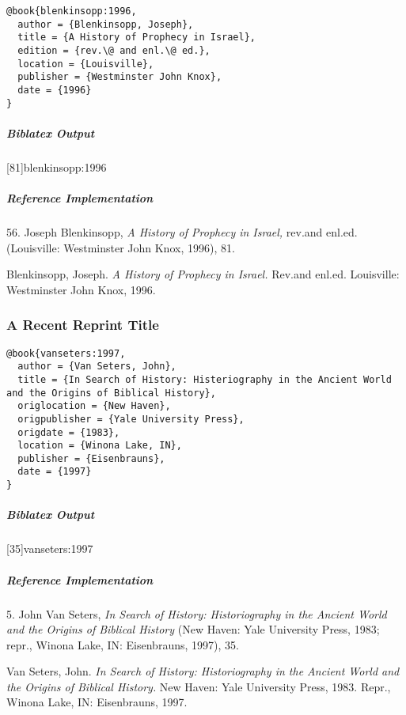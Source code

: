 \documentclass[a4paper]{article}
\newenvironment{biboutput}{%
  \subparagraph{Biblatex Output}
}{\color{black}}
\newenvironment{refimp}{%
  \subparagraph{Reference Implementation}
  \color{reference-colour}
  \rm
}{\par\color{black}}
\begin{document}
\begin{lstlisting}
@book{blenkinsopp:1996,
  author = {Blenkinsopp, Joseph},
  title = {A History of Prophecy in Israel},
  edition = {rev.\@ and enl.\@ ed.},
  location = {Louisville},
  publisher = {Westminster John Knox},
  date = {1996}
}
\end{lstlisting}  

\begin{biboutput}
  [81]{blenkinsopp:1996}
\end{biboutput}

\begin{refimp}
  \hspace*{\bibindent}56. Joseph Blenkinsopp, \emph{A History of Prophecy in
  Israel,} rev.\@ and enl.\@ ed. (Louisville: Westminster John Knox, 1996), 81.

  \hangindent\bibindent Blenkinsopp, Joseph. \emph{A History of Prophecy in
  Israel.} Rev.\@ and enl.\@ ed. Louisville: Westminster John Knox, 1996.
\end{refimp}

\subsubsection{A Recent Reprint Title}

\begin{lstlisting}
@book{vanseters:1997,
  author = {Van Seters, John},
  title = {In Search of History: Histeriography in the Ancient World and the Origins of Biblical History},
  origlocation = {New Haven},
  origpublisher = {Yale University Press},
  origdate = {1983},
  location = {Winona Lake, IN},
  publisher = {Eisenbrauns},
  date = {1997}
}
\end{lstlisting}  

\begin{biboutput}
  [35]{vanseters:1997}
\end{biboutput}

\begin{refimp}
  \hspace*{\bibindent}5. John Van Seters, \emph{In Search of History:
  Historiography in the Ancient World and the Origins of Biblical History}
  (New Haven: Yale University Press, 1983; repr., Winona Lake, IN:
  Eisenbrauns, 1997), 35.

  \hangindent\bibindent Van Seters, John. \emph{In Search of History:
  Historiography in the Ancient World and the Origins of Biblical History.}
  New Haven: Yale University Press, 1983. Repr., Winona Lake, IN: Eisenbrauns,
  1997.
\end{refimp}
\end{document}
